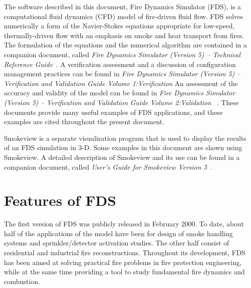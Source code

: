 \documentclass[11pt]{book}
\begin{document}
The software described in this document, Fire Dynamics Simulator (FDS), is a computational
fluid dynamics (CFD) model of fire-driven fluid flow. FDS solves numerically a form of the
Navier-Stokes equations appropriate for low-speed, thermally-driven flow
with an emphasis on smoke and heat transport from fires.
The formulation of the equations and the numerical algorithm are contained in a companion document,
called {\em Fire Dynamics Simulator (Version 5) -- Technical Reference Guide}~\cite{FDS_Tech_Guide_5}.
A verification assessment and a discussion of configuration management practices can be found in
{\em Fire Dynamics Simulator (Version 5) -- Verification and Validation Guide Volume 1:Verification}
An assessment of the accuracy and validity of the model can be found in {\em Fire Dynamics Simulator
(Version 5) -- Verification and Validation Guide Volume 2:Validation} ~\cite{FDS_VV_Guide_5}.
These documents provide many useful examples of FDS applications, and these examples are cited
throughout the present document.

Smokeview is a separate visualization program that is used to display the
results of an FDS simulation in 3-D. Some examples in this document are shown using Smokeview.
A detailed description of Smokeview and its use can be found in a companion document, called
{\em User's Guide for Smokeview Version 5}~\cite{Smokeview_Users_Guide_5}.


\section{Features of FDS}

The first version of FDS was publicly released in February 2000.
To date, about half of the applications of the model have been for design of smoke
handling systems and sprinkler/detector activation studies. The other half consist of
residential and industrial fire reconstructions. Throughout its development, FDS has
been aimed at solving practical fire problems in fire protection engineering, while
at the same time providing a tool to study fundamental fire dynamics and combustion.
\end{document}
